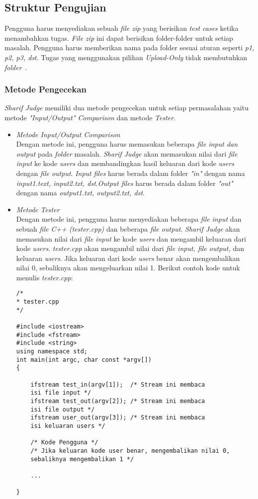 \subsection{Struktur Pengujian}

Pengguna harus menyediakan sebuah \textit{file zip} yang berisikan \textit{test cases} ketika menambahkan tugas. \textit{File zip} ini dapat berisikan folder-folder untuk setiap masalah. Pengguna harus memberikan nama pada folder sesuai aturan seperti \textit{p1, p2, p3, dst}. Tugas yang menggunakan pilihan \textit{Upload-Only} tidak membutuhkan \textit{folder}~\cite{mjnaderi:14:sharifjudgedoc}.

\subsubsection{Metode Pengecekan}
\textit{Sharif Judge} memiliki dua metode pengecekan untuk setiap permasalahan yaitu metode \textit{"Input/Output" Comparison} dan metode \textit{Tester}.
\begin{itemize}
	\item \textit{Metode Input/Output Comparison} \\
	Dengan metode ini, pengguna harus memasukan beberapa \textit{file input dan output} pada \textit{folder} masalah. \textit{Sharif Judge} akan memasukan nilai dari \textit{file input} ke kode \textit{users} dan membandingkan hasil keluaran dari kode \textit{users} dengan \textit{file output}. \textit{Input files} harus berada dalam folder \textit{"in"} dengan nama \textit{input1.text, input2.txt, dst}.\textit{Output files} harus berada dalam folder \textit{"out"} dengan nama \textit{output1.txt, output2.txt, dst}.
	
	\item \textit{Metode Tester} \\
	Dengan metode ini, pengguna harus menyediakan beberapa \textit{file input} dan sebuah \textit{file C++ (tester.cpp)} dan beberapa \textit{file output}. \textit{Sharif Judge} akan memasukan nilai dari \textit{file input} ke kode \textit{users} dan mengambil keluaran dari kode \textit{users}. \textit{tester.cpp} akan mengambil nilai dari \textit{file input, file output, }dan keluaran \textit{users}. Jika keluaran dari kode \textit{users} benar akan mengembalikan nilai 0, sebaliknya akan mengeluarkan nilai 1. Berikut contoh kode untuk menulis \textit{tester.cpp}:
	\begin{lstlisting}[backgroundcolor = \color{lightgray}]
/*
* tester.cpp
*/

#include <iostream>
#include <fstream>
#include <string>
using namespace std;
int main(int argc, char const *argv[])
{
	
	ifstream test_in(argv[1]);  /* Stream ini membaca 
	isi file input */
	ifstream test_out(argv[2]); /* Stream ini membaca 
	isi file output */
	ifstream user_out(argv[3]); /* Stream ini membaca 
	isi keluaran users */
	
	/* Kode Pengguna */
	/* Jika keluaran kode user benar, mengembalikan nilai 0, 
	sebaliknya mengembalikan 1 */
	
	...

}
	\end{lstlisting}
\end{itemize}

